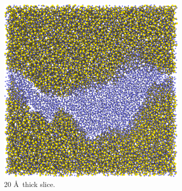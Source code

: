 \begin{figure}[!p]
\begin{subfigure}[t]{\myfigwidth}
        \includegraphics[width=\textwidth]{images/systems/trimmed-rough_fracture01_abel_16}%
        \caption{20 \AA\ thick slice.}%
    \end{subfigure}%
    \hfill%
    \begin{subfigure}[t]{\myfigwidth}%
        \centering%

\end{subfigure}
\end{figure}
